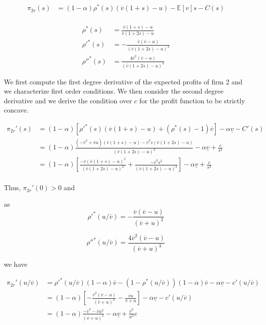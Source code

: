 \documentclass[a4paper,leqno]{article}%
\newcommand{\E}{\mathbb E}
\renewcommand{\a}{\alpha}
\newcommand{\uv}{\underline{v}}
\newcommand{\ov}{\overline{v}}
\begin{document}
\begin{equation}
    \begin{aligned}
\pi_{2r}(s)&=(1-\a)\rho^*(s)(\ov(1+s)-u)-\E[v]s-C(s)\\
\end{aligned}
\end{equation}

\begin{equation}
    \begin{aligned}
\rho^*(s)&=\frac{\ov(1+s)-u}{\ov(1+2s)-u}\\
\rho'^{*}(s)&=-\frac{\ov(\ov-u)}{(\ov(1+2s)-u)^2}\\
\rho''^{*}(s)&=\frac{4\ov^2(\ov-u)}{(\ov(1+2s)-u)^3}
    \end{aligned}
\end{equation}

We first compute the first degree derivative of the expected profits of firm 2 and we characterize first order conditions. We then consider the second degree derivative and we derive the condition over $c$ for the profit function to be strictly concave.

\begin{equation}
    \begin{aligned}
\pi_{2r}'(s)&=(1-\a)[\rho'^*(s)(\ov(1+s)-u)+(\rho^*(s)-1)\ov]-\a \uv-C'(s)\\
            &=(1-\a)\frac{(-\ov^2+\ov u)(\ov(1+s)-u)-\ov^2s(\ov(1+2s)-u)}{(\ov(1+2s)-u)^2}-\a \uv+\frac{c}{s^2}\\
            &=(1-\a)\left[\frac{-\ov(\ov(1+s)-u)^2}{(\ov(1+2s)-u)^2}+\frac{-\ov^3s^2}{(\ov(1+2s)-u)^2}\right]-\a \uv+\frac{c}{s^2}\\
\end{aligned}
\end{equation}

Thus, $\pi_{2r}'(0)>0$ and 

as $$\rho'^{*}(u/\ov)=-\frac{\ov(\ov-u)}{(\ov+u)^2}$$

$$\rho''^{*}(u/\ov)=\frac{4\ov^2(\ov-u)}{(\ov+u)^3}$$

we have

\begin{equation}
    \begin{aligned}
\pi_{2r}'(u/\ov)&=\rho'^*(u/\ov)(1-\a)\ov-(1-\rho^*(u/\ov))(1-\a)\ov-\a\uv-c'(u/\ov)\\
                &=(1-\a)\left[-\frac{\ov^2(\ov-u)}{(\ov+u)^2}-\frac{\ov u}{\ov+u}\right]-\a \uv-c'(u/\ov)\\
                &= (1-\a)\frac{-\ov^3-\ov u^2}{(\ov+u)^2}-\a \uv+\frac{\ov^2}{u^2}c
    \end{aligned}
\end{equation}
\end{document}
